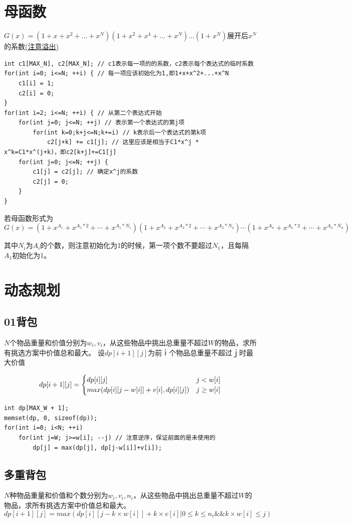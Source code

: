 \documentclass[a4paper]{ctexrep}
\begin{document}
\section{母函数}
$G(x)=(1+x+x^2+\dots+x^N)(1+x^2+x^4+\dots+x^N)\dots(1+x^N)$展开后$x^N$的系数\underline{(注意溢出)}\\
\begin{lstlisting}
int c1[MAX_N], c2[MAX_N]; // c1表示每一项的的系数，c2表示每个表达式的临时系数
for(int i=0; i<=N; ++i) { // 每一项应该初始化为1,即1+x+x^2+...+x^N
	c1[i] = 1;
	c2[i] = 0;
}
for(int i=2; i<=N; ++i) { // 从第二个表达式开始
	for(int j=0; j<=N; ++j) // 表示第一个表达式的第j项
		for(int k=0;k+j<=N;k+=i) // k表示后一个表达式的第k项
			c2[j+k] += c1[j]; // 这里应该是相当于C1*x^j * x^k=C1*x^(j+k)，即c2[k+j]+=C1[j]
	for(int j=0; j<=N; ++j) {
		c1[j] = c2[j]; // 确定x^j的系数
		c2[j] = 0;
	}
}
\end{lstlisting}

若母函数形式为$$G(x) = (1+x^{A_1} + x^{A_1*2} +\cdots + x^{A_1*N_1}) (1+x^{A_2} + x^{A_2*2} +\cdots + x^{A_2*N_2}) \cdots (1+x^{A_n} + x^{A_n*2} +\cdots + x^{A_n*N_n})$$

其中$N_i$为$A_i$的个数，则注意初始化为1的时候，第一项个数不要超过$N_1$，且每隔$A_1$初始化为1。
\section{动态规划}
\subsection{01背包}
$N$个物品重量和价值分别为$w_i, v_i$，从这些物品中挑出总重量不超过$W$的物品，求所有挑选方案中价值总和最大。
设$dp[i+1][j]$为前ｉ个物品总重量不超过ｊ时最大价值

$$dp[i+1][j] = \begin{cases}
dp[i][j] & j < w[i] \cr
max(dp[i][j-w[i]]+v[i], dp[i][j]) & j \geq w[i] 
\end{cases}
$$

\begin{lstlisting}
int dp[MAX_W + 1];
memset(dp, 0, sizeof(dp));
for(int i=0; i<N; ++i)
	for(int j=W; j>=w[i]; --j) // 注意逆序，保证前面的是未使用的
		dp[j] = max(dp[j], dp[j-w[i]]+v[i]);
\end{lstlisting}

\subsection{多重背包}
$N$种物品重量和价值和个数分别为$w_i, v_i, n_i$，从这些物品中挑出总重量不超过$W$的物品，求所有挑选方案中价值总和最大。
$$dp[i+1][j] = max(dp[i][j-k \times w[i]] + k\times v[i] | 0\leq k \leq n_i \&\& k \times w[i] \leq j) $$
\end{document}
